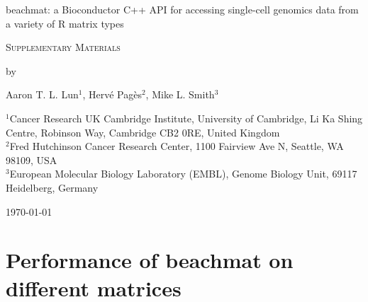 \documentclass{article}
\begin{document}
\begin{titlepage}
\vspace*{3cm}
\begin{center}


{\LARGE
beachmat: a Bioconductor C++ API for accessing single-cell genomics data from a variety of R matrix types
\par}

\vspace{0.75cm}

{\Large
    \textsc{Supplementary Materials}
\par
}
\vspace{0.75cm}

\large
by


\vspace{0.75cm}
Aaron T. L. Lun$^1$,
Herv\'e Pag\`es$^2$,
Mike L. Smith$^3$

\vspace{1cm}
\begin{minipage}{0.9\textwidth}
\begin{flushleft}
$^1$Cancer Research UK Cambridge Institute, University of Cambridge, Li Ka Shing Centre, Robinson Way, Cambridge CB2 0RE, United Kingdom \\[6pt]
$^2$Fred Hutchinson Cancer Research Center, 1100 Fairview Ave N, Seattle, WA 98109, USA \\[6pt]
$^3$European Molecular Biology Laboratory (EMBL), Genome Biology Unit, 69117 Heidelberg, Germany \\[6pt]
\end{flushleft}
\end{minipage}

\vspace{1.5cm}
{\large \today{}}

\vspace*{\fill}
\end{center}
\end{titlepage}

\providecommand{\myceil}[1]{\left \lceil #1 \right \rceil }

\section{Performance of beachmat on different matrices}
\end{document}
